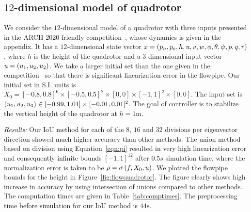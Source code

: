\subsection{$12$-dimensional model of quadrotor}
We consider the $12$-dimensional model of a quadrotor with three
inputs presented in the ARCH 2020 friendly
competition~\cite{geretti2020arch}, whose dynamics is given in the
appendix.  It has a $12$-dimensional state vector $x
= \left(p_n,p_e,h,u,v,w,\phi,\theta,\psi,p,q,r\right)$, where $h$ is the
height of the quadrotor and a $3$-dimensional input vector $u
= \left(u_1,u_2,u_2\right)$.  We take a larger initial set than the one given
in the competition~\cite{geretti2020arch} so that there is significant
linearization error in the flowpipe.  Our initial set in S.I. units
is $X_0 = [-0.8,0.8]^6\times[-0.5,0.5]^2\times[0,0]\times
[-1,1]^2\times[0,0]$.  The input set is $\left(u_1,u_2,u_3\right)\in
[-0.99,1.01]\times[-0.01,0.01]^2$.  The goal of controller is to
stabilize the vertical height of the quadrotor at $h = 1\si{\meter}$.

  

\emph{Results:}  Our IoU method for each of the $8$, $16$ and $32$ divisions per
  eigenvector direction showed much higher accuracy than other
  methods.  The union method based on division using
  Equation~\ref{eqn:pi} resulted in very high linearization error and
  consequently infinite bounds $[-1,1]^{12}$ after $0.5 s$ simulation
  time, where the normalization error is taken to be $\rho
  = \sigma\left(f,X_0,u\right)$.  We plotted the flowpipe bounds for the
  height in Figure~\ref{fig:flowquadrotor}.  The figure clearly shows
  high increase in accuracy by using intersection of unions compared
  to other methods.  The computation times are given in
  Table~\ref{tab:comptimes}.  The preprocessing time before simulation
  for our IoU method is $44\si{\second}$.
%
